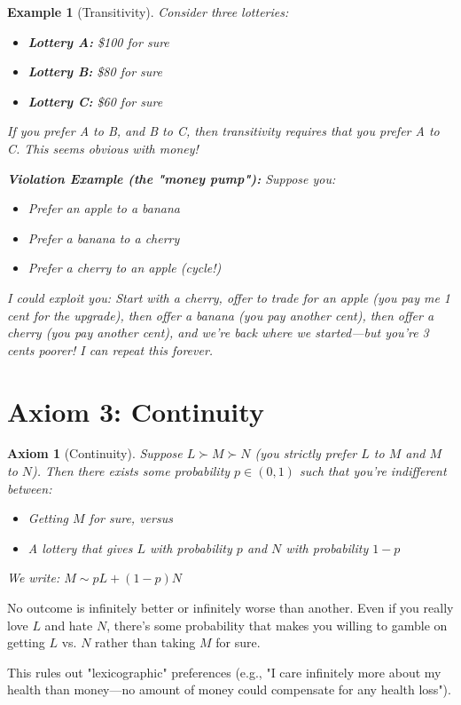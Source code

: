 \documentclass[12pt]{article}
\newtheorem{axiom}{Axiom}
\newtheorem{example}{Example}
\begin{document}
\begin{example}[Transitivity]
Consider three lotteries:
\begin{itemize}
\item \textbf{Lottery A:} \$100 for sure
\item \textbf{Lottery B:} \$80 for sure
\item \textbf{Lottery C:} \$60 for sure
\end{itemize}

If you prefer A to B, and B to C, then transitivity requires that you prefer A to C. This seems obvious with money!

\vspace{0.2cm}

\textbf{Violation Example (the "money pump"):} Suppose you:
\begin{itemize}
\item Prefer an apple to a banana
\item Prefer a banana to a cherry
\item Prefer a cherry to an apple (cycle!)
\end{itemize}

I could exploit you: Start with a cherry, offer to trade for an apple (you pay me 1 cent for the upgrade), then offer a banana (you pay another cent), then offer a cherry (you pay another cent), and we're back where we started—but you're 3 cents poorer! I can repeat this forever.
\end{example}

\newpage

\section{Axiom 3: Continuity}

\begin{axiom}[Continuity]
Suppose $L \succ M \succ N$ (you strictly prefer $L$ to $M$ and $M$ to $N$). Then there exists some probability $p \in (0,1)$ such that you're indifferent between:
\begin{itemize}
\item Getting $M$ for sure, versus
\item A lottery that gives $L$ with probability $p$ and $N$ with probability $1-p$
\end{itemize}

We write: $M \sim pL + (1-p)N$
\end{axiom}

\begin{tcolorbox}[colback=intuitioncolor,colframe=orange!75!black,title=Intuition]
No outcome is infinitely better or infinitely worse than another. Even if you really love $L$ and hate $N$, there's some probability that makes you willing to gamble on getting $L$ vs. $N$ rather than taking $M$ for sure.

This rules out "lexicographic" preferences (e.g., "I care infinitely more about my health than money—no amount of money could compensate for any health loss").
\end{tcolorbox}
\end{document}

